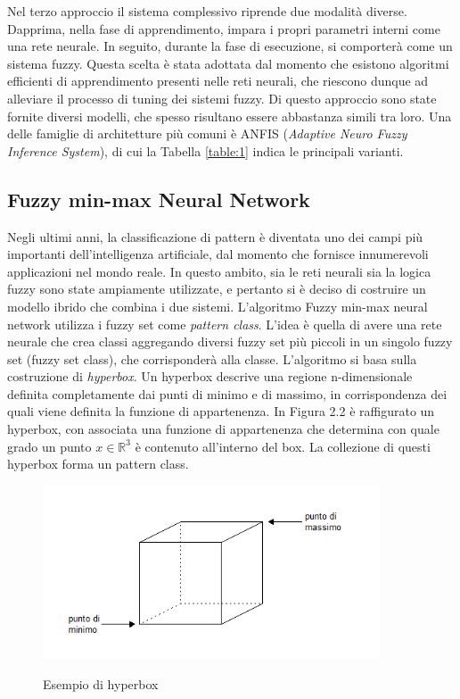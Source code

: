 \documentclass[11pt,  oneside, openany]{book}
\begin{document}
Nel terzo approccio il sistema complessivo riprende due modalità diverse. Dapprima, nella fase di apprendimento, impara i propri parametri interni come una rete neurale. In seguito, durante la fase di esecuzione, si comporterà come un sistema fuzzy. Questa scelta è stata adottata dal momento che esistono algoritmi efficienti di apprendimento presenti nelle reti neurali, che riescono dunque ad alleviare il processo di tuning dei sistemi fuzzy. Di questo approccio sono state fornite diversi modelli, che spesso risultano essere abbastanza simili tra loro. Una delle famiglie di architetture più comuni è ANFIS (\textit{Adaptive Neuro Fuzzy Inference System}), di cui la Tabella \ref{table:1} indica le principali varianti. 

\subsection{Fuzzy min-max Neural Network}

Negli ultimi anni, la classificazione di pattern è diventata uno dei campi più importanti dell'intelligenza artificiale, dal momento che fornisce innumerevoli applicazioni nel mondo reale. In questo ambito, sia le reti neurali sia la logica fuzzy sono state ampiamente utilizzate, e pertanto si è deciso di costruire un modello ibrido che combina i due sistemi. 
L'algoritmo Fuzzy min-max neural network utilizza i fuzzy set come \textit{pattern class}. L'idea è quella di avere una rete neurale che crea classi aggregando diversi fuzzy set più piccoli in un singolo fuzzy set (fuzzy set class), che corrisponderà alla classe. L'algoritmo si basa sulla costruzione di \textit{hyperbox}. Un hyperbox descrive una regione n-dimensionale definita completamente dai punti di minimo e di massimo, in corrispondenza dei quali viene definita la funzione di appartenenza. In Figura 2.2 è raffigurato un hyperbox, con associata una funzione di appartenenza che determina con quale grado un punto $x\in \mathbb{R}^3$ è contenuto all'interno del box. La collezione di questi hyperbox forma un pattern class. 

\begin{figure}[h!]
\begin{center}
  \includegraphics[width=10cm]{Immagini/hyperbox.png}\\
  \caption{Esempio di hyperbox}
\end{center}
\end{figure}
\end{document}
